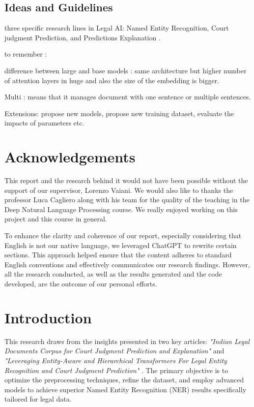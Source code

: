 \documentclass{article}
\begin{document}
\subsection*{Ideas and Guidelines}
 three specific research lines in Legal AI: Named Entity Recognition, Court judgment Prediction, and Predictions Explanation  \cite{article2}.
 
 to remember :

difference between large and base models : same architecture but higher number of attention layers in huge and also the size of the embedding is bigger.

Multi : means that it manages document with one sentence or multiple sentences.


Extensions: propose new models, propose new training dataset, evaluate the impacts of parameters etc.


\newpage
\section*{Acknowledgements}
This report and the research behind it would not have been possible without the support of our supervisor, Lorenzo Vaiani. We would also like to thanks the professor Luca Cagliero along with his team for the quality of the teaching in the Deep Natural Language Processing course. We really enjoyed working on this project and this course in general. 

To enhance the clarity and coherence of our report, especially considering that English is not our native language, we leveraged ChatGPT to rewrite certain sections. This approach helped ensure that the content adheres to standard English conventions and effectively communicates our research findings. However, all the research conducted, as well as the results generated and the code developed, are the outcome of our personal efforts.





\newpage
\section{Introduction}

This research draws from the insights presented in two key articles: \textit{"Indian Legal Documents Corpus for Court Judgment Prediction and Explanation"} \cite{article1} and \textit{"Leveraging Entity-Aware and Hierarchical Transformers For Legal Entity Recognition and Court Judgment Prediction"} \cite{article2}. The primary objective is to optimize the preprocessing techniques, refine the dataset, and employ advanced models to achieve superior Named Entity Recognition (NER) results specifically tailored for legal data.
\end{document}
